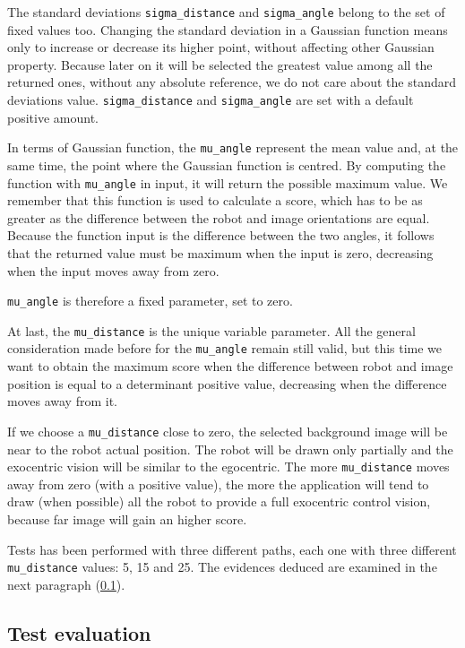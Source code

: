 %
The standard deviations \texttt{sigma\_distance} and \texttt{sigma\_angle} belong to the set of
fixed values too. Changing the standard deviation in a Gaussian function means only to increase or decrease its higher
point, without affecting other Gaussian property. Because later on it will be selected the greatest value among
all the returned ones, without any absolute reference, we do not care about the standard deviations value.
\texttt{sigma\_distance} and \texttt{sigma\_angle} are set with a default positive amount.
%

%
In terms of Gaussian function, the \texttt{mu\_angle} represent the mean value and, at the same time, the point where
the Gaussian function is centred. By computing the function with \texttt{mu\_angle} in input, it will return the possible
maximum value. We remember that this function is used to calculate a score, which has to be as greater as the difference
between the robot and image orientations are equal. Because the function input is the difference between the two angles, it
follows that the returned value must be maximum when the input is zero, decreasing when the input moves away from zero.
%

%
\texttt{mu\_angle} is therefore a fixed parameter, set to zero.
%

%
At last, the \texttt{mu\_distance} is the unique variable parameter. All the general consideration made before for the 
\texttt{mu\_angle} remain still valid, but this time we want to obtain the maximum score when the difference between
robot and image position is equal to a determinant positive value, decreasing when the difference moves away from it.
%

%
If we choose a \texttt{mu\_distance} close to zero, the selected background image will be near to the robot actual position.
The robot will be drawn only partially and the exocentric vision will be similar to the egocentric. The more
\texttt{mu\_distance} moves away from zero (with a positive value), the more the application will tend to draw
(when possible) all the robot to provide a full exocentric control vision, because far image will gain an higher score.
%

%
Tests has been performed with three different paths, each one with three different \texttt{mu\_distance} values: 5, 15
and 25. The evidences deduced are examined in the next paragraph (\ref{subsec:testevaluation}).

\subsection{Test evaluation}
\label{subsec:testevaluation}

